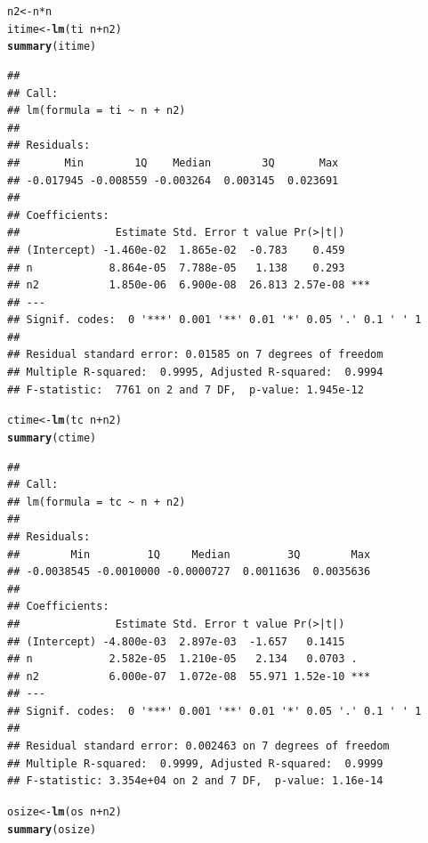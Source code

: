 \documentclass[10pt]{article}\usepackage[]{graphicx}\usepackage[]{color}
\makeatletter
\newcommand{\hlopt}[1]{\textcolor[rgb]{0,0,0}{#1}}%
\newcommand{\hlstd}[1]{\textcolor[rgb]{0.345,0.345,0.345}{#1}}%
\newcommand{\hlkwb}[1]{\textcolor[rgb]{0.69,0.353,0.396}{#1}}%
\newcommand{\hlkwd}[1]{\textcolor[rgb]{0.737,0.353,0.396}{\textbf{#1}}}%
\newenvironment{kframe}{%
 \def\at@end@of@kframe{}%
 \ifinner\ifhmode%
  \def\at@end@of@kframe{\end{minipage}}%
  \begin{minipage}{\columnwidth}%
 \fi\fi%
 \def\FrameCommand##1{\hskip\@totalleftmargin \hskip-\fboxsep
 \colorbox{shadecolor}{##1}\hskip-\fboxsep
     \hskip-\linewidth \hskip-\@totalleftmargin \hskip\columnwidth}%
 \MakeFramed {\advance\hsize-\width
   \@totalleftmargin\z@ \linewidth\hsize
   \@setminipage}}%
 {\par\unskip\endMakeFramed%
 \at@end@of@kframe}
\newenvironment{knitrout}{}{} %
\makeatother
\begin{document}
\begin{knitrout}\scriptsize
{}\color{fgcolor}\begin{kframe}
\begin{alltt}
\hlstd{n2}\hlkwb{<-}\hlstd{n}\hlopt{*}\hlstd{n}
\hlstd{itime}\hlkwb{<-}\hlkwd{lm}\hlstd{(ti}\hlopt{~}\hlstd{n}\hlopt{+}\hlstd{n2)}
\hlkwd{summary}\hlstd{(itime)}
\end{alltt}
\begin{verbatim}
## 
## Call:
## lm(formula = ti ~ n + n2)
## 
## Residuals:
##       Min        1Q    Median        3Q       Max 
## -0.017945 -0.008559 -0.003264  0.003145  0.023691 
## 
## Coefficients:
##               Estimate Std. Error t value Pr(>|t|)    
## (Intercept) -1.460e-02  1.865e-02  -0.783    0.459    
## n            8.864e-05  7.788e-05   1.138    0.293    
## n2           1.850e-06  6.900e-08  26.813 2.57e-08 ***
## ---
## Signif. codes:  0 '***' 0.001 '**' 0.01 '*' 0.05 '.' 0.1 ' ' 1
## 
## Residual standard error: 0.01585 on 7 degrees of freedom
## Multiple R-squared:  0.9995,	Adjusted R-squared:  0.9994 
## F-statistic:  7761 on 2 and 7 DF,  p-value: 1.945e-12
\end{verbatim}
\begin{alltt}
\hlstd{ctime}\hlkwb{<-}\hlkwd{lm}\hlstd{(tc}\hlopt{~}\hlstd{n}\hlopt{+}\hlstd{n2)}
\hlkwd{summary}\hlstd{(ctime)}
\end{alltt}
\begin{verbatim}
## 
## Call:
## lm(formula = tc ~ n + n2)
## 
## Residuals:
##        Min         1Q     Median         3Q        Max 
## -0.0038545 -0.0010000 -0.0000727  0.0011636  0.0035636 
## 
## Coefficients:
##               Estimate Std. Error t value Pr(>|t|)    
## (Intercept) -4.800e-03  2.897e-03  -1.657   0.1415    
## n            2.582e-05  1.210e-05   2.134   0.0703 .  
## n2           6.000e-07  1.072e-08  55.971 1.52e-10 ***
## ---
## Signif. codes:  0 '***' 0.001 '**' 0.01 '*' 0.05 '.' 0.1 ' ' 1
## 
## Residual standard error: 0.002463 on 7 degrees of freedom
## Multiple R-squared:  0.9999,	Adjusted R-squared:  0.9999 
## F-statistic: 3.354e+04 on 2 and 7 DF,  p-value: 1.16e-14
\end{verbatim}
\begin{alltt}
\hlstd{osize}\hlkwb{<-}\hlkwd{lm}\hlstd{(os}\hlopt{~}\hlstd{n}\hlopt{+}\hlstd{n2)}
\hlkwd{summary}\hlstd{(osize)}
\end{alltt}



\end{kframe}
\end{knitrout}
\end{document}
